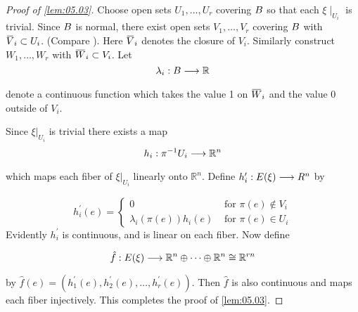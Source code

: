 \documentclass[../main]{subfiles}
\begin{document}
\begin{proof}[Proof of \ref{lem:05.03}]
Choose open sets $U_{1}, \dots, U_{r}$ covering $B $ so that each $\xi \mid _{U_{i}}$ is trivial. Since $B $ is normal, there exist open sets $V_{1}, \dots, V_{r}$ covering $B $ with $\xoverline{V}_{i} \subset U_{i}$. (Compare \cite[p. 171]{kelley1955}). Here $\xoverline{V}_{i}$ denotes the closure of $V_{i} .$ Similarly construct $W_{1}, \dots, W_{r}$ with $\xoverline{W}_{i} \subset V_{i} $. Let
\[\map{\lambda_{i}}{\B }{\mathbb{R}}
\]
denote a continuous function which takes the value 1 on $\xoverline{W}_{i}$ and the value 0 outside of $V_{i}$.

Since $\xi|_{ U_{i}}$ is trivial there exists a map
\[\map{h_{i}}{\pi^{-1} U_{i}}{\mathbb{R}^{n}}
\]
which maps each fiber of $\xi| _{U_{i}}$ linearly onto $\mathbb{R}^{n}$. Define $\map{h_{i}^{\prime}}{\total(\xi)}{R^{n}}$ by

\[
h_{i}^{\prime}(e)=\begin{cases}
	0 & \text { for } \pi(e) \notin V_{i} \\
	\lambda_{i}(\pi(e)) h_{i}(e) & \text { for } \pi(e) \in U_{i}
\end{cases}
\]
Evidently $h_{i}^{\prime}$ is continuous, and is linear on each fiber. Now define

\[\map{\hat{f}}{\total(\xi)}{\mathbb{R}^{n} \oplus \dots \oplus \mathbb{R}^{n} \cong \mathbb{R}^{rn}}
\]
by $\hat{f}(e)=(h_{1}^{\prime}(e), h_{2}^{\prime}(e), \dots, h_{r}^{\prime}(e))$. Then $\hat{f}$ is also continuous and maps each fiber injectively. This completes the proof of \ref{lem:05.03}.	
\end{proof}
\end{document}
